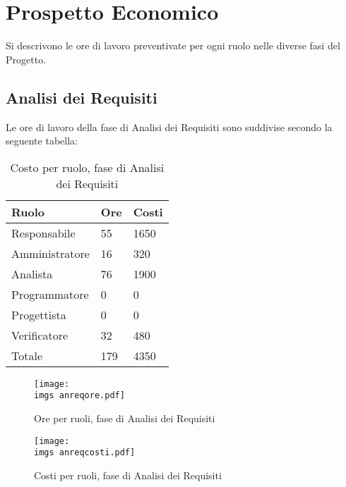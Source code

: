 \section{Prospetto Economico}{
	Si descrivono le ore di lavoro preventivate per ogni ruolo nelle diverse fasi del Progetto.
\subsection{Analisi dei Requisiti}{
	Le ore di lavoro della fase di Analisi dei Requisiti sono suddivise secondo la seguente tabella:
	\begin{table}[H]
		\centering
	  \begin{tabular}{p{}p{}
		    							p{}}
		   \toprule Ruolo & Ore & Costi \\
		   \midrule
		   Responsabile & 55 & 1650 \\
		   Amministratore & 16 & 320 \\
		   Analista & 76 & 1900 \\
		   Programmatore & 0 & 0 \\
		   Progettista & 0 & 0 \\
		   Verificatore & 32 & 480 \\
		   Totale & 179 & 4350 \\
		   \bottomrule
	 \end{tabular}
	 	\label{tab:costorequisiti}
	 	\caption{Costo per ruolo, fase di Analisi dei Requisiti}
	\end{table}
	
	\begin{figure}[H]
		\centering
		\texttt{[image: \\imgs anreqore.pdf]}
		\label{fig:orerequisiti}
		\caption{Ore per ruoli, fase di Analisi dei Requisiti}
	\end{figure}
	\begin{figure}[H]
		\centering
		\texttt{[image: \\imgs anreqcosti.pdf]}
		\label{fig:costorequisiti}
		\caption{Costi per ruoli, fase di Analisi dei Requisiti}
	\end{figure}
}
}
